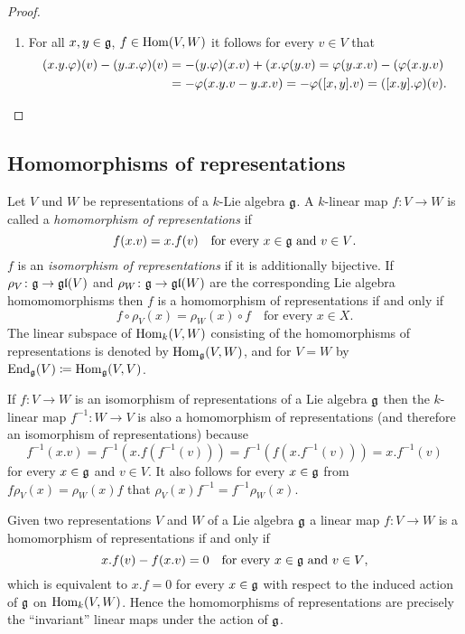 \begin{proof}
\begin{enumerate}[leftmargin=*]
  \item
   For all $x,y \in \mathfrak{g}$, $f \in \operatorname{Hom}(V,W)$ it follows for every $v \in V$ that
   \begin{align*}
    (x.y.\varphi)(v) - (y.x.\varphi)(v)
    &= -(y.\varphi)(x.v) + (x.\varphi(y.v)
    = \varphi(y.x.v) - (\varphi(x.y.v) \\
    &= -\varphi(x.y.v - y.x.v)
    = -\varphi([x,y].v)
    = ([x.y].\varphi)(v).
   \qedhere
   \end{align*}
 \end{enumerate}
\end{proof}





\subsection{Homomorphisms of representations}


\begin{defi}
 Let $V$ und $W$ be representations of a $k$-Lie algebra $\mathfrak{g}$. A $k$-linear map $f \colon V \to W$ is called a \emph{homomorphism of representations} if
 \[
  f(x.v) = x.f(v) \quad \text{for every $x \in \mathfrak{g}$ and $v \in V$}.
 \]
 $f$ is an \emph{isomorphism of representations} if it is additionally bijective. If $\rho_V \colon \mathfrak{g} \to \mathfrak{gl}(V)$ and $\rho_W \colon \mathfrak{g} \to \mathfrak{gl}(W)$ are the corresponding Lie algebra homomomorphisms then $f$ is a homomorphism of representations if and only if
 \[
  f \circ \rho_V(x) = \rho_W(x) \circ f \quad \text{for every $x \in X$}.
 \]
 The linear subspace of $\operatorname{Hom}_k(V,W)$ consisting of the homomorphisms of representations is denoted by $\operatorname{Hom}_{\mathfrak{g}}(V,W)$, and for $V = W$ by $\operatorname{End}_{\mathfrak{g}}(V) \coloneqq \operatorname{Hom}_{\mathfrak{g}}(V,V)$. 
\end{defi}


\begin{rem}
 If $f \colon V \to W$ is an isomorphism of representations of a Lie algebra $\mathfrak{g}$ then the $k$-linear map $f^{-1} \colon W \to V$ is also a homomorphism of representations (and therefore an isomorphism of representations) because
 \[
  f^{-1}(x.v) = f^{-1}(x.f(f^{-1}(v))) = f^{-1}(f(x.f^{-1}(v))) = x.f^{-1}(v)
 \]
 for every $x \in \mathfrak{g}$ and $v \in V$. It also follows for every $x \in \mathfrak{g}$ from $f \rho_V(x) = \rho_W(x) f$ that $\rho_V(x) f^{-1} = f^{-1} \rho_W(x)$.
\end{rem}


\begin{rem}
 Given two representations $V$ and $W$ of a Lie algebra $\mathfrak{g}$ a linear map $f \colon V \to W$ is a homomorphism of representations if and only if
 \[
  x.f(v) - f(x.v) = 0 \quad \text{for every $x \in \mathfrak{g}$ and $v \in V$},
 \]
 which is equivalent to $x.f = 0$ for every $x \in \mathfrak{g}$ with respect to the induced action of $\mathfrak{g}$ on $\operatorname{Hom}_k(V,W)$. Hence the homomorphisms of representations are precisely the ``invariant'' linear maps under the action of $\mathfrak{g}$.
\end{rem}


